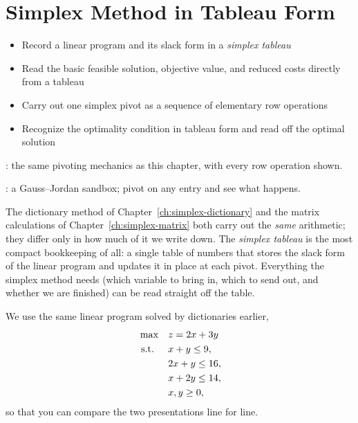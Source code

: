 
\chapter{Simplex Method in Tableau Form}
\label{ch:simplex-tableau}
\begin{outcome}
\begin{itemize}
\item Record a linear program and its slack form in a \emph{simplex tableau}
\item Read the basic feasible solution, objective value, and reduced costs directly from a tableau
\item Carry out one simplex pivot as a sequence of elementary row operations
\item Recognize the optimality condition in tableau form and read off the optimal solution
\end{itemize}
\end{outcome}

\begin{tryit}
: the same pivoting mechanics as this chapter, with every row operation shown.

: a Gauss--Jordan sandbox; pivot on any entry and see what happens.
\end{tryit}




The dictionary method of Chapter~\ref{ch:simplex-dictionary} and the matrix calculations of Chapter~\ref{ch:simplex-matrix} both carry out the \emph{same} arithmetic; they differ only in how much of it we write down. The \emph{simplex tableau} is the most compact bookkeeping of all: a single table of numbers that stores the slack form of the linear program and updates it in place at each pivot. Everything the simplex method needs (which variable to bring in, which to send out, and whether we are finished) can be read straight off the table.

We use the same linear program solved by dictionaries earlier,
\begin{equation*}
\begin{aligned}
\max\quad & z = 2x + 3y\\
\text{ s.t. }\quad  & x + y  \le 9,\\
          & 2x + y \le 16,\\
          & x + 2y \le 14,\\
          & x, y \ge 0,
\end{aligned}
\end{equation*}
so that you can compare the two presentations line for line.

